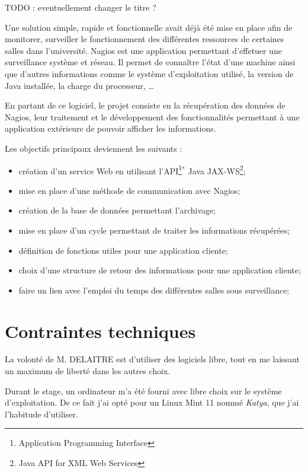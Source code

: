  TODO : eventuellement changer le titre ?

Une solution simple, rapide et fonctionnelle avait d\'ej\`a \'et\'e mise en place afin de \og{}monitorer\fg{}, \cad{} surveiller le fonctionnement des diff\'erentes ressources de certaines salles dans l'universit\'e.
Nagios est une application permettant d'effetuer une surveillance syst\`eme et r\'eseau.
Il permet de conna\^itre l'\'etat d'une machine ainsi que d'autres informations comme le syst\`eme d'exploitation utilis\'e, la version de Java install\'ee, la charge du processeur, \ldots

En partant de ce logiciel, le projet consiste en la r\'ecup\'eration des donn\'ees de Nagios, leur traitement et le d\'eveloppement des fonctionnalit\'es permettant \`a une application ext\'erieure de pouvoir afficher les informations.

\noindent Les objectifs principaux deviennent les suivants :

\begin{itemize}
	\item cr\'eation d'un service Web en utilisant l'API\protect\footnote{Application Programming Interface}$^*$ Java JAX-WS\protect\footnote{Java API for XML Web Services};
	\item mise en place d'une m\'ethode de communication avec Nagios;
	\item cr\'eation de la base de donn\'ees permettant l'archivage;
	\item mise en place d'un cycle permettant de traiter les informations r\'ecup\'er\'ees;
	\item d\'efinition de fonctions utiles pour une application cliente;
	\item choix d'une structure de retour des informations pour une application cliente;
	\item faire un lien avec l'emploi du temps des diff\'erentes salles sous surveillance;

\end{itemize}

\section{Contraintes techniques}

La volont\'e de M. DELAITRE est d'utiliser des logiciels libre, tout en me laissant un maximum de libert\'e dans les autres choix.

Durant le stage, un ordinateur m'a \'et\'e fourni avec libre choix sur le syst\`eme d'exploitation.
De ce fait j'ai opt\'e pour un Linux Mint 11 nomm\'e \textit{Katya}, que j'ai l'habitude d'utiliser.


